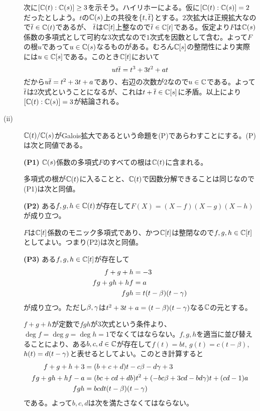 \begin{sol}
\begin{description}
    次に$[{\mathbb C}(t):{\mathbb C}(s)] \geq 3$を示そう。ハイリホーによる。仮に$[{\mathbb C}(t):{\mathbb C}(s)] = 2$だったとしよう。$t$の${\mathbb C}(s)$上の共役を$\{t,\overline{t} \}$とする。$2$次拡大は正規拡大なので$\overline{t} \in {\mathbb C}(t)$であるが、
    $\overline{t}$は${\mathbb C}[t]$上整なので$\overline{t} \in {\mathbb C}[t]$である。仮定より$F$は${\mathbb C}(s)$係数の多項式として可約な$3$次式なので$1$次式を因数として含む。よって$F$の根$u$であって$u \in {\mathbb C}(s)$なるものがある。むろん${\mathbb C}[s]$の整閉性により実際には$u \in {\mathbb C}[s]$である。このとき${\mathbb C}[t]$において
    \[
    ut\overline{t} = t^3 +3t^2 + at
    \]
    だから$u\overline{t} = t^2 +3t + a$であり、右辺の次数が$2$なので$u \in {\mathbb C}$である。よって$\overline{t}$は$2$次式ということになるが、これは$t + \overline{t} \in {\mathbb C}[s]$に矛盾。以上により$[{\mathbb C}(t):{\mathbb C}(s)] = 3$が結論される。
    \item[(ii)] ${\mathbb C}(t)/{\mathbb C}(s)$がGalois拡大であるという命題を(P)であらわすことにする。(P)は次と同値である。
\begin{oframed}
  \textbf{(P1)} \quad ${\mathbb C}(s)$係数の多項式$F$のすべての根は${\mathbb C}(t)$に含まれる。
\end{oframed}
  多項式の根が${\mathbb C}(t)$に入ることと、${\mathbb C}(t)$で因数分解できることは同じなので(P1)は次と同値。
  \begin{oframed}
    \textbf{(P2)} \quad ある$f,g,h \in {\mathbb C}(t)$が存在して$F(X) = (X-f)(X-g)(X-h)$が成り立つ。
  \end{oframed}
  $F$は${\mathbb C}[t]$係数のモニック多項式であり、かつ${\mathbb C}[t]$は整閉なので$f,g,h \in {\mathbb C}[t]$としてよい。つまり(P2)は次と同値。
  \begin{oframed}
    \textbf{(P3)} \quad ある$f,g,h \in {\mathbb C}[t]$が存在して
    \begin{align*}
      f+g+h &= -3 \\
      fg + gh + hf &= a \\
      fgh &= t(t-\beta)(t-{\gamma})
    \end{align*}
    が成り立つ。ただし$\beta,{\gamma}$は$t^2 + 3t + a= (t-\beta)(t-{\gamma})$なる${\mathbb C}$の元とする。
  \end{oframed}
  $f+g+h$が定数で$fgh$が$3$次式という条件より、$\deg f = \deg g = \deg h = 1$でなくてはならない。$f,g,h$を適当に並び替えることにより、ある$b,c,d \in {\mathbb C}$が存在して$f(t) =bt$, $g(t) =c(t-\beta)$, $h(t) =d (t-{\gamma})$と表せるとしてよい。このとき計算すると
  \begin{align*}
    f+g+h + 3&= (b+c+d)t - c\beta -d{\gamma} +3 \\
    fg + gh + hf-a &= (bc+cd+db)t^2 + (-bc\beta +3cd - bd{\gamma})t +(cd-1)a \\
    fgh &= bcd t(t-\beta)(t-{\gamma})
  \end{align*}
  である。よって$b,c,d$は次を満たさなくてはならない。

\end{description}
\end{sol}
